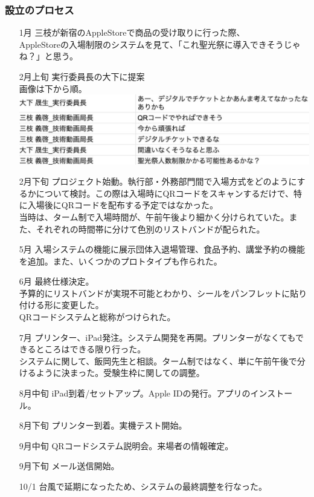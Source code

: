 \documentclass[dvipdfmx,jb5]{jarticle}
\begin{document}
\subsubsection{設立のプロセス}
\begin{itemize}
 \item[1月] 三枝が新宿のAppleStoreで商品の受け取りに行った際、\\AppleStoreの入場制限のシステムを見て、「これ聖光祭に導入できそうじゃね？」と思う。
 \item[2月上旬] 実行委員長の大下に提案\\
 画像は下から順。\\
 \includegraphics[scale=0.3]{assets/QR_the_beginning.jpg}
 \item[2月下旬] プロジェクト始動。執行部・外務部門間で入場方式をどのようにするかについて検討。この際は入場時にQRコードをスキャンするだけで、特に入場後にQRコードを配布する予定ではなかった。\\当時は、ターム制で入場時間が、午前午後より細かく分けられていた。また、それぞれの時間帯に分けて色別のリストバンドが配られた。
 \item[5月] 入場システムの機能に展示団体入退場管理、食品予約、講堂予約の機能を追加。また、いくつかのプロトタイプも作られた。
 \item[6月] 最終仕様決定。\\予算的にリストバンドが実現不可能とわかり、シールをパンフレットに貼り付ける形に変更した。\\QRコードシステムと総称がつけられた。
 \item[7月] プリンター、iPad発注。システム開発を再開。プリンターがなくてもできるところはできる限り行った。\\システムに関して、飯岡先生と相談。ターム制ではなく、単に午前午後で分けるように決まった。受験生枠に関しての調整。
 \item[8月中旬] iPad到着/セットアップ。Apple IDの発行。アプリのインストール。
 \item[8月下旬] プリンター到着。実機テスト開始。
 \item[9月中旬] QRコードシステム説明会。来場者の情報確定。
 \item[9月下旬] メール送信開始。
 \item[10/1] 台風で延期になったため、システムの最終調整を行なった。
\end{itemize}
\end{document}
